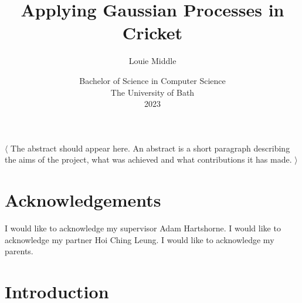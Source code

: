\documentclass[12pt,a4paper]{report}
\title{\bf Applying Gaussian Processes in Cricket}
\author{Louie Middle}
\date{Bachelor of Science in Computer Science\\ 
      The University of Bath\\
      2023}
\theoremstyle{definition}
\begin{document}
\hypersetup{pageanchor=false}	

\lstset{language=Java,breaklines,breakatwhitespace,basicstyle=\small}

\setcounter{page}{0}

\maketitle
\newpage

\newpage

\newpage

\hypersetup{pageanchor=true}

\abstract
$\langle$
The abstract should appear here. 
An abstract is a short paragraph describing the aims of the project, what was achieved and what contributions it has made.
$\rangle$
\newpage

\tableofcontents
\newpage

\listoffigures
\newpage

\listoftables
\newpage

\listofalgorithms
\newpage

\chapter*{Acknowledgements}

I would like to acknowledge my supervisor Adam Hartshorne.
I would like to acknowledge my partner Hoi Ching Leung.
I would like to acknowledge my parents.

\newpage
\setcounter{page}{1}

\chapter{Introduction}
\end{document}
